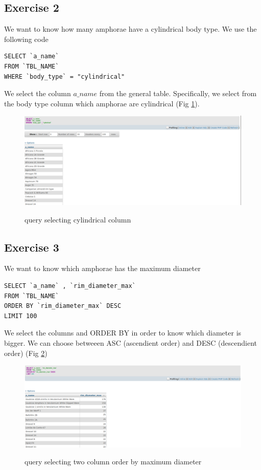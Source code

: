 \documentclass[10pt,a4paper]{article}
\begin{document}
\subsection{Exercise 2}

We want to know how many amphorae have a cylindrical body type. We use the following code

\begin{verbatim}
SELECT `a_name`
FROM `TBL_NAME`
WHERE `body_type` = "cylindrical"
\end{verbatim}

We select the column $a\_name$ from the general table. Specifically, we select from the body type column which amphorae are cylindrical (Fig \ref{query2}). 

\begin{figure}[hdp]
\centering
\includegraphics[scale=0.30]{query2.png}
\label{query2}
\caption{query selecting cylindrical column}
\end{figure} 


\subsection{Exercise 3}

We want to know which amphorae has the maximum diameter 

\begin{verbatim}
SELECT `a_name` , `rim_diameter_max`
FROM `TBL_NAME`
ORDER BY `rim_diameter_max` DESC
LIMIT 100 
\end{verbatim}

We select the columns and ORDER BY in order to know which diameter is bigger. We can choose betweeen ASC (ascendient order) and DESC (descendient order) (Fig \ref{query3})

\begin{figure}[hdp]
\centering
\includegraphics[scale=0.30]{query3.png}
\label{query3}
\caption{query selecting two column order by maximum diameter}
\end{figure} 
\end{document}
